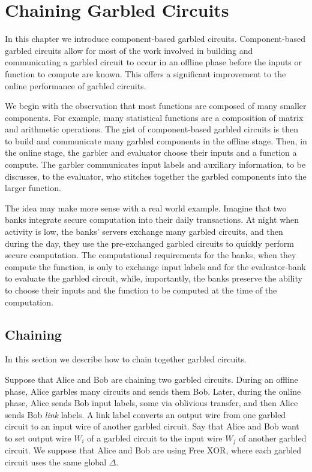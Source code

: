 
\chapter{Chaining Garbled Circuits}

In this chapter we introduce component-based garbled circuits.
Component-based garbled circuits allow for most of the work involved in building and communicating a garbled circuit to occur in an offline phase before the inputs or function to compute are known. 
This offers a significant improvement to the online performance of garbled circuits. 

We begin with the observation that most functions are composed of many smaller components. 
For example, many statistical functions are a composition of matrix and arithmetic operations.
The gist of component-based garbled circuits is then to build and communicate many garbled components in the offline stage. 
Then, in the online stage, the garbler and evaluator choose their inputs and a function a compute. 
The garbler communicates input labels and auxiliary information, to be discusses, to the evaluator, who stitches together the garbled components into the larger function.

The idea may make more sense with a real world example. 
Imagine that two banks integrate secure computation into their daily transactions.
At night when activity is low, the banks' servers exchange many garbled circuits, and then during the day, they use the pre-exchanged garbled circuits to quickly perform secure computation.
The computational requirements for the banks, when they compute the function, is only to exchange input labels and for the evaluator-bank to evaluate the garbled circuit, while, importantly, the banks preserve the ability to choose their inputs and the function to be computed at the time of the computation. 

\section{Chaining}


In this section we describe how to chain together garbled circuits.

Suppose that Alice and Bob are chaining two garbled circuits.
During an offline phase, Alice garbles many circuits and sends them Bob.
Later, during the online phase, Alice sends Bob input labels, some via oblivious transfer, and then Alice sends Bob \textit{link} labels.
A link label converts an output wire from one garbled circuit to an input wire of another garbled circuit.
Say that Alice and Bob want to set output wire $W_i$ of a garbled circuit to the input wire $W_j$ of another garbled circuit.
We suppose that Alice and Bob are using Free XOR, where each garbled circuit uses the same global $\Delta$.

